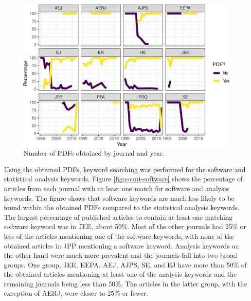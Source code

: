 \documentclass[
  english,
  ,man]{apa6}
\begin{document}
\begin{figure}
\centering
\includegraphics{software_files/figure-latex/pdf-time-1.pdf}
\caption{\label{fig:pdf-time}Number of PDFs obtained by journal and year.}
\end{figure}

Using the obtained PDFs, keyword searching was performed for the software and statistical analysis keywords. Figure \ref{fig:count-software} shows the percentage of articles from each journal with at least one match for software and analysis keywords. The figure shows that software keywords are much less likely to be found within the obtained PDFs compared to the statistical analysis keywords. The largest percentage of published articles to contain at least one matching software keyword was in JEE, about 50\%. Most of the other journals had 25\% or less of the articles mentioning one of the software keywords, with none of the obtained articles in JPP mentioning a software keyword. Analysis keywords on the other hand were much more prevalent and the journals fall into two broad groups. One group, JEE, EEPA, AEJ, AJPS, SE, and EJ have more than 50\% of the obtained articles mentioning at least one of the analysis keywords and the remaining journals being less than 50\%. The articles in the latter group, with the exception of AERJ, were closer to 25\% or fewer.
\end{document}
